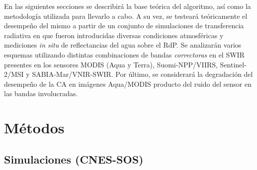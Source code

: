     En las siguientes secciones se describirá la base teórica del algoritmo, así como la metodología utilizada para llevarlo a cabo. A su vez, se testeará teóricamente el desempeño del mismo a partir de un conjunto de simulaciones de transferencia radiativa en que fueron introducidas diversas condiciones atmosféricas y mediciones \textit{in situ} de reflectancias del agua sobre el RdP. Se analizarán varios esquemas utilizando distintas combinaciones de bandas \textit{correctoras} en el SWIR presentes en los sensores MODIS (Aqua y Terra), Suomi-NPP/VIIRS, Sentinel-2/MSI y SABIA-Mar/VNIR-SWIR. Por último, se considerará la degradación del desempeño de la CA en imágenes Aqua/MODIS producto del ruido del sensor en las bandas involucradas.

\section{Métodos}
\label{pca:s:metodos}

    \subsection{Simulaciones (CNES-SOS)}
    \label{pca:s:simulaciones}

